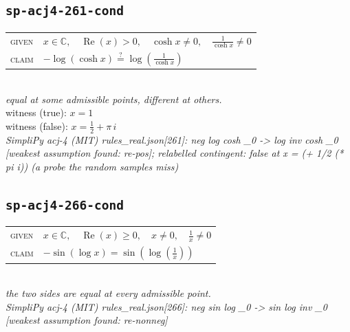\documentclass[11pt]{article}
\begin{document}
\subsection*{\texttt{sp-acj4-261-cond}}
\begin{tabular}{@{}l@{\quad}l@{}}
\textsc{given} & $x \in \mathbb{C},\quad \operatorname{Re}\left(x\right) > 0,\quad \cosh x \neq 0,\quad \frac{1}{\cosh x} \neq 0$ \\[4pt]
\textsc{claim} & $\displaystyle -\log\left(\cosh x\right) \overset{?}{=} \log\left(\frac{1}{\cosh x}\right)$ \\
\end{tabular}\\[2pt]
{\small\emph{equal at some admissible points, different at others.}}\\
{\footnotesize\color{gray}witness (true): $x = 1$}\\
{\footnotesize\color{gray}witness (false): $x = \frac{1}{2} + \pi \, i$}\\
\emph{SimpliPy acj-4 (MIT) rules\_real.json[261]: neg log cosh \_0  ->  log inv cosh \_0  [weakest assumption found: re-pos]; relabelled contingent: false at x = (+ 1/2 (* pi i)) (a probe the random samples miss)}\\

\subsection*{\texttt{sp-acj4-266-cond}}
\begin{tabular}{@{}l@{\quad}l@{}}
\textsc{given} & $x \in \mathbb{C},\quad \operatorname{Re}\left(x\right) \ge 0,\quad x \neq 0,\quad \frac{1}{x} \neq 0$ \\[4pt]
\textsc{claim} & $\displaystyle -\sin\left(\log x\right) = \sin\left(\log\left(\frac{1}{x}\right)\right)$ \\
\end{tabular}\\[2pt]
{\small\emph{the two sides are equal at every admissible point.}}\\
\emph{SimpliPy acj-4 (MIT) rules\_real.json[266]: neg sin log \_0  ->  sin log inv \_0  [weakest assumption found: re-nonneg]}\\
\end{document}
